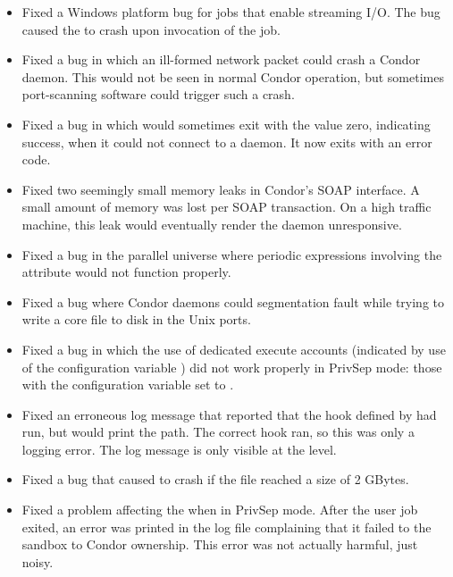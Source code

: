 \begin{itemize}
\item Fixed a Windows platform bug for jobs that enable streaming I/O.
  The bug caused the  to crash upon invocation of the
  job.

\item Fixed a bug in which an ill-formed network packet could crash a
Condor daemon.  This would not be seen in normal Condor operation, but
sometimes port-scanning software could trigger such a crash.

\item Fixed a bug in which  would sometimes exit with 
  the value zero, indicating success,
  when it could not connect to a  daemon.
  It now exits with an error code.

\item Fixed two seemingly small memory leaks in Condor's SOAP
interface. A small amount of memory was lost per SOAP transaction. On
a high traffic machine, this leak would eventually render the
 daemon unresponsive.

\item Fixed a bug in the parallel universe where periodic expressions
involving the  attribute would not function properly.

\item Fixed a bug where Condor daemons could segmentation fault while trying
to write a core file to disk in the Unix ports.

\item Fixed a bug in which the use of dedicated execute accounts
(indicated by use of the configuration variable
) did not work properly
in PrivSep mode: those with the configuration variable
 set to .

\item Fixed an erroneous log message that reported that
the hook defined by  had run,
but would print the  path.
The correct hook ran, so this was only a logging error.
The log message is only visible at the  level.

\item Fixed a bug that caused  to crash if the
 file reached a size of 2 GBytes.

\item Fixed a problem affecting the  when in PrivSep mode.
After the user job exited, an error was printed in the
 log file complaining that it failed to  the
sandbox to Condor ownership.  This error was not actually harmful,
just noisy.


\end{itemize}
